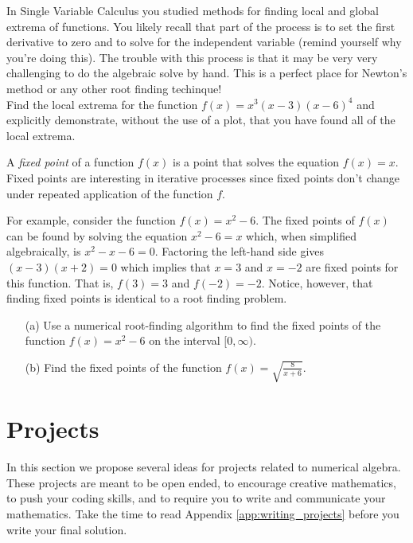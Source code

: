 \begin{problem}
    In Single Variable Calculus you studied methods for finding local and global extrema
    of functions. You likely recall that part of the process is to set the first
    derivative to zero and to solve for the independent variable (remind yourself why
    you're doing this).  The trouble with this process is that it may be very very
    challenging to do the algebraic solve by hand.  This is a perfect place for Newton's
    method or any other root finding techinque! \\
    Find the local extrema for the function $f(x) = x^3(x-3)(x-6)^4$ and explicitly
    demonstrate, without the use of a plot, that you have found all of the local extrema.
\end{problem}



\begin{problem}

    A {\it fixed point} of a function $f(x)$ is a point that solves the equation $f(x) =
    x$.  Fixed points are interesting in iterative processes since fixed points don't
    change under repeated application of the function $f$.  

    For example, consider the function $f(x) = x^2 - 6$.  The fixed points of $f(x)$ can be found by
    solving the equation $x^2 - 6 = x$ which, when simplified algebraically, is $x^2 - x -
    6 = 0$.  Factoring the left-hand side gives $(x-3)(x+2)=0$ which implies that $x=3$
    and $x=-2$ are fixed points for this function. That is, $f(3) = 3$ and $f(-2) = -2$.
    Notice, however, that finding fixed points is identical to a root finding problem.
    \begin{enumerate}
        \item[(a)] Use a numerical root-finding algorithm to find the fixed points of the
            function $f(x) = x^2 - 6$ on the interval $[0,\infty)$.
            \item[(b)] Find the fixed points of the function $f(x) =
                \sqrt{\frac{8}{x+6}}$.
        \end{enumerate}
    \end{problem}



\newpage\section{Projects}
In this section we propose several ideas for projects related to numerical algebra.  These
projects are meant to be open ended, to encourage creative mathematics, to push your
coding skills, and to require you to write and communicate your mathematics.  Take the
time to read Appendix \ref{app:writing_projects} before you write your final solution.

